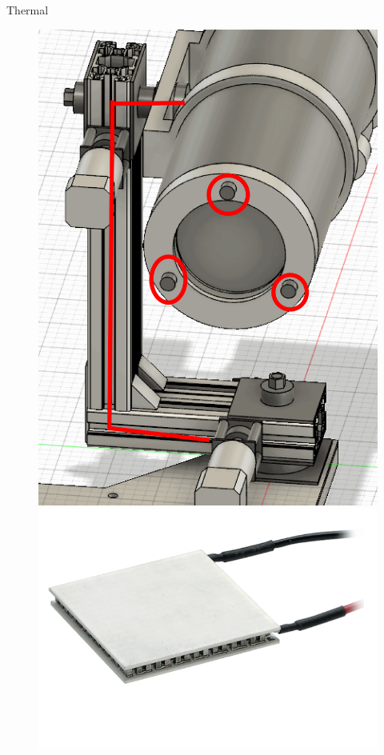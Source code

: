\documentclass[11pt, aspectratio=169]{beamer}
\begin{document}
\begin{frame}[c]{Thermal}
    \begin{figure}[h!]
        \centering
        \includegraphics[height=.7\textheight]{images/thermalpaths.png}
        \includegraphics[height=.7\textheight]{images/peltierelement.png}
    \end{figure}
\end{frame}
\end{document}
